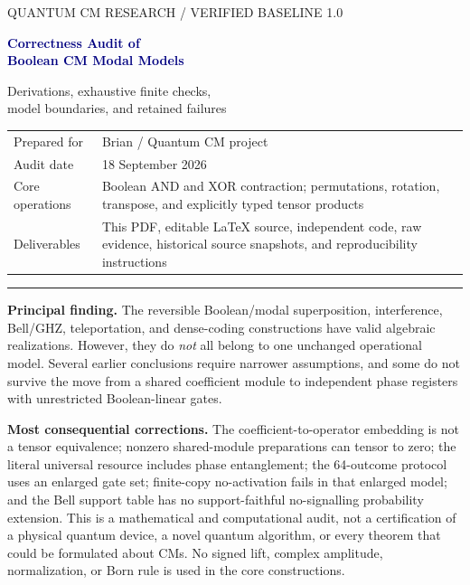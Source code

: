 \documentclass[11pt,a4paper]{article}
\theoremstyle{definition}\newtheorem{definition}[theorem]{Definition}
\begin{document}
\begin{titlepage}
\vspace*{14mm}
{\small\sffamily\textcolor{muted}{QUANTUM CM RESEARCH / VERIFIED BASELINE 1.0}}\par
\vspace{9mm}
{\Huge\bfseries\textcolor{navy}{Correctness Audit of\\[3mm]Boolean CM Modal Models}}\par
\vspace{7mm}
{\Large Derivations, exhaustive finite checks,\\model boundaries, and retained failures}\par
\vspace{12mm}
\begin{tabularx}{\textwidth}{@{}L{34mm}Y@{}}
Prepared for & Brian / Quantum CM project\\
Audit date & 18 September 2026\\
Core operations & Boolean AND and XOR contraction; permutations, rotation, transpose, and explicitly typed tensor products\\
Deliverables & This PDF, editable LaTeX source, independent code, raw evidence, historical source snapshots, and reproducibility instructions
\end{tabularx}
\vspace{12mm}
\hrule\vspace{5mm}
\textbf{Principal finding.} The reversible Boolean/modal superposition, interference, Bell/GHZ, teleportation, and dense-coding constructions have valid algebraic realizations. However, they do \emph{not} all belong to one unchanged operational model. Several earlier conclusions require narrower assumptions, and some do not survive the move from a shared coefficient module to independent phase registers with unrestricted Boolean-linear gates.

\textbf{Most consequential corrections.} The coefficient-to-operator embedding is not a tensor equivalence; nonzero shared-module preparations can tensor to zero; the literal universal resource includes phase entanglement; the 64-outcome protocol uses an enlarged gate set; finite-copy no-activation fails in that enlarged model; and the Bell support table has no support-faithful no-signalling probability extension.
\vfill
{\small This is a mathematical and computational audit, not a certification of a physical quantum device, a novel quantum algorithm, or every theorem that could be formulated about CMs. No signed lift, complex amplitude, normalization, or Born rule is used in the core constructions.}
\end{titlepage}
\tableofcontents
\newpage
\end{document}
